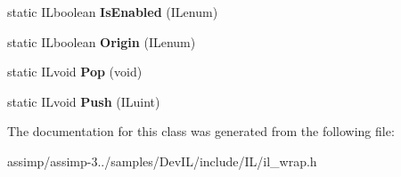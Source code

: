 \begin{DoxyCompactItemize}
\item 
\hypertarget{classil_state_a3a825abb8673d607bc7236582706fb61}{static I\+Lboolean {\bfseries Is\+Enabled} (I\+Lenum)}\label{classil_state_a3a825abb8673d607bc7236582706fb61}

\item 
\hypertarget{classil_state_aee802bef060eb301f5ee41e76e0d365b}{static I\+Lboolean {\bfseries Origin} (I\+Lenum)}\label{classil_state_aee802bef060eb301f5ee41e76e0d365b}

\item 
\hypertarget{classil_state_a81e65157cbaa8ced4a26dde3e877cdf2}{static I\+Lvoid {\bfseries Pop} (void)}\label{classil_state_a81e65157cbaa8ced4a26dde3e877cdf2}

\item 
\hypertarget{classil_state_ac0196b03ec0b8424a48299ec1f730308}{static I\+Lvoid {\bfseries Push} (I\+Luint)}\label{classil_state_ac0196b03ec0b8424a48299ec1f730308}

\end{DoxyCompactItemize}


The documentation for this class was generated from the following file\+:\begin{DoxyCompactItemize}
\item 
assimp/assimp-\/3../samples/\+Dev\+I\+L/include/\+I\+L/il\+\_\+wrap.\+h\end{DoxyCompactItemize}
